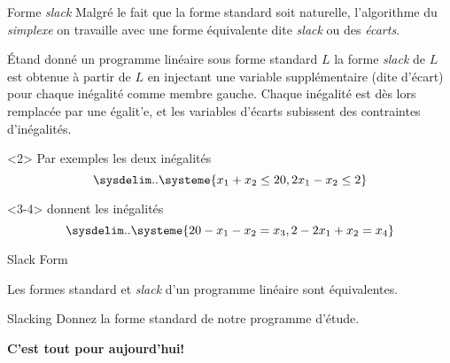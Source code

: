 \documentclass[aspectratio = 169]{beamer}
\begin{document}
\begin{frame}{Forme \textit{slack}}
  Malgr\'e le fait que la forme standard soit naturelle, l'algorithme
  du \emph{simplexe} on travaille avec une forme \'equivalente dite
  \emph{slack} ou des \emph{\'ecarts}.
  \begin{defn}
    \'Etand donn\'e un programme lin\'eaire sous forme standard $L$ la
    forme \textit{slack} de $L$ est obtenue \`a partir de $L$ en
    injectant une variable suppl\'ementaire (dite d'\'ecart) pour
    chaque in\'egalit\'e comme membre gauche. Chaque in\'egalit\'e est
    d\`es lors remplac\'ee par une \'egalit'e, et les variables
    d'\'ecarts subissent des contraintes d'in\'egalit\'es.
  \end{defn}
  \vspace{1em}
  \begin{overlayarea}{\textwidth}{.35\textheight}
    \begin{onlyenv}<2>
      Par exemples les deux in\'egalit\'es
      \[
      \sysdelim..\systeme{x_1 + x_2 \leq 20, 2x_1 - x_2 \leq 2}
      \]
    \end{onlyenv}
    \begin{onlyenv}<3-4>
      donnent les in\'egalit\'es
      \[
      \sysdelim..\systeme{20 - x_1 - x_2 = x_3, 2 - 2x_1 + x_2 = x_4 }
      \]
    \end{onlyenv}
  \end{overlayarea}
\end{frame}

\begin{frame}{Slack Form}
  \begin{prop}
    Les formes standard et \textit{slack} d'un programme
    lin\'eaire sont \'equivalentes.
  \end{prop}
  \pause
  \begin{halfshyblock}{Slacking}
    Donnez la forme standard de notre programme d'\'etude.
  \end{halfshyblock}
\end{frame}

\begin{frame}
  \begin{center}
    {\huge \textbf{C'est tout pour aujourd'hui!}}
   \end{center}
 \end{frame}

\end{document}
